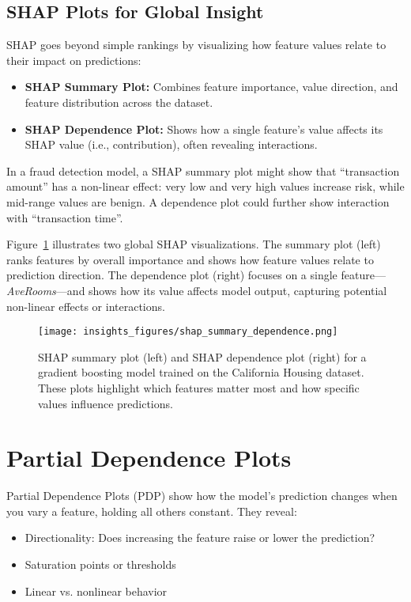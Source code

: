 \documentclass[12pt,openany]{book}
\begin{document}
\subsection{SHAP Plots for Global Insight}

SHAP goes beyond simple rankings by visualizing how feature values relate to their impact on predictions:

\begin{itemize}
  \item \textbf{SHAP Summary Plot:} Combines feature importance, value direction, and feature distribution across the dataset.
  \item \textbf{SHAP Dependence Plot:} Shows how a single feature’s value affects its SHAP value (i.e., contribution), often revealing interactions.
\end{itemize}

\begin{examplebox}
In a fraud detection model, a SHAP summary plot might show that ``transaction amount'' has a non-linear effect: very low and very high values increase risk, while mid-range values are benign. A dependence plot could further show interaction with ``transaction time''.
\end{examplebox}


Figure~\ref{fig:shap-summary-dependence} illustrates two global SHAP visualizations. The summary plot (left) ranks features by overall importance and shows how feature values relate to prediction direction. The dependence plot (right) focuses on a single feature—\textit{AveRooms}—and shows how its value affects model output, capturing potential non-linear effects or interactions.

\begin{figure}[H]
    \centering
    \texttt{[image: insights\_figures/shap\_summary\_dependence.png]}
    \caption{SHAP summary plot (left) and SHAP dependence plot (right) for a gradient boosting model trained on the California Housing dataset. These plots highlight which features matter most and how specific values influence predictions.}
    \label{fig:shap-summary-dependence}
\end{figure}



\section{Partial Dependence Plots }

Partial Dependence Plots (PDP) show how the model's prediction changes when you vary a feature, holding all others constant. They reveal:
\begin{itemize}
  \item Directionality: Does increasing the feature raise or lower the prediction?
  \item Saturation points or thresholds
  \item Linear vs. nonlinear behavior
\end{itemize}
\end{document}
